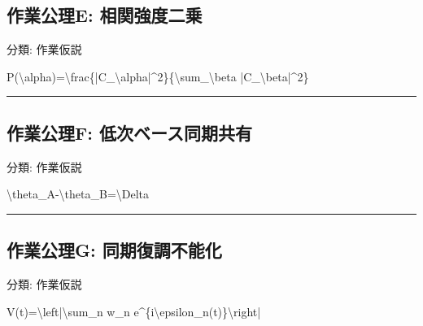 \documentclass[
  a4paper]{ltjsarticle}
\newenvironment{Shaded}{}{}
\newcommand{\NormalTok}[1]{#1}
\begin{document}
\subsection{作業公理E:
相関強度二乗}\label{ux4f5cux696dux516cux7406e-ux76f8ux95a2ux5f37ux5ea6ux4e8cux4e57}

分類: 作業仮説

\begin{Shaded}
\begin{Highlighting}[]
\NormalTok{P(\textbackslash{}alpha)=\textbackslash{}frac\{|C\_\textbackslash{}alpha|\^{}2\}\{\textbackslash{}sum\_\textbackslash{}beta |C\_\textbackslash{}beta|\^{}2\}}
\end{Highlighting}
\end{Shaded}

\begin{center}\rule{0.5\linewidth}{0.5pt}\end{center}

\subsection{作業公理F:
低次ベース同期共有}\label{ux4f5cux696dux516cux7406f-ux4f4eux6b21ux30d9ux30fcux30b9ux540cux671fux5171ux6709}

分類: 作業仮説

\begin{Shaded}
\begin{Highlighting}[]
\NormalTok{\textbackslash{}theta\_A{-}\textbackslash{}theta\_B=\textbackslash{}Delta}
\end{Highlighting}
\end{Shaded}

\begin{center}\rule{0.5\linewidth}{0.5pt}\end{center}

\subsection{作業公理G:
同期復調不能化}\label{ux4f5cux696dux516cux7406g-ux540cux671fux5fa9ux8abfux4e0dux80fdux5316}

分類: 作業仮説

\begin{Shaded}
\begin{Highlighting}[]
\NormalTok{V(t)=\textbackslash{}left|\textbackslash{}sum\_n w\_n e\^{}\{i\textbackslash{}epsilon\_n(t)\}\textbackslash{}right|}
\end{Highlighting}
\end{Shaded}
\end{document}
